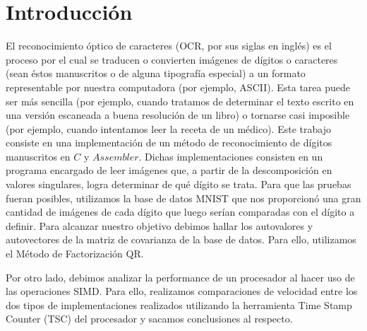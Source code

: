 \documentclass[10pt, a4paper]{article}
\author{Organización del Computador II, DC, UBA.}
\date{}
\title{}
\begin{document}
	
\thispagestyle{empty}

\maketitle

\tableofcontents
\newpage

\section{Introducci\'on}
El reconocimiento óptico de caracteres (OCR, por sus siglas en inglés) es el proceso por el cual se traducen o convierten imágenes de dígitos o caracteres (sean éstos manuscritos o de alguna tipografía especial) a un formato representable por nuestra computadora (por ejemplo, ASCII). Esta tarea puede ser más sencilla (por ejemplo, cuando tratamos de determinar el texto escrito en una versión escaneada a buena resolución de un libro) o tornarse casi imposible (por ejemplo, cuando intentamos leer la receta de un médico).\newline
\newline
Este trabajo consiste en una implementación de un método de reconocimiento de dígitos manuscritos en $C$ y $Assembler$. Dichas implementaciones consisten en un programa encargado de leer imágenes que, a partir de la descomposición en valores singulares, logra determinar de qué dígito se trata. Para que las pruebas fueran posibles, utilizamos la base de datos MNIST que nos proporcionó una gran cantidad de imágenes de cada dígito que luego serían comparadas con el dígito a definir. Para alcanzar nuestro objetivo debimos hallar los autovalores y autovectores de la matriz de covarianza de la base de datos. Para ello, utilizamos el Método de Factorización QR.

Por otro lado, debimos analizar la performance de un procesador al hacer uso de las operaciones SIMD. Para ello, realizamos comparaciones de velocidad entre los dos tipos de implementaciones realizados utilizando la herramienta Time Stamp Counter (TSC) del procesador y sacamos conclusiones al respecto.
\end{document}
